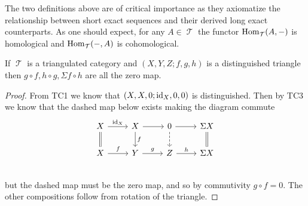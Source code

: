 \documentclass[11pt]{article}
\DeclareMathOperator{\TT}{\mathcal{T}}
\begin{document}
The two definitions above are of critical importance as they axiomatize the relationship between short exact sequences and their derived long exact counterparts. As one should expect, for any $A \in \TT$ the functor $\Hom_{\TT}(A,-)$ is homological and $\Hom_{\TT}(-,A)$ is cohomological.

\begin{lem}
If $\TT$ is a triangulated category and $(X,Y,Z; f,g,h)$ is a distinguished triangle then $g\circ f,h\circ g,\Sigma f\circ h$ are all the zero map.
\end{lem}
\begin{proof}
From TC1 we know that $(X,X,0; \operatorname{id}_X, 0,0)$ is distinguished. Then by TC3 we know that the dashed map below exists making the diagram commute
\[\begin{tikzcd}
X \ar[r,"\id_X"] \ar[d, equal] & X \ar[r] \ar[d,"f"] & 0 \ar[d,dashed] \ar[r] & \Sigma X \ar[d,equal]\\
X \ar[r,"f"] & Y \ar[r,"g"] & Z \ar[r,"h"] & \Sigma X\\
\end{tikzcd}\]
but the dashed map must be the zero map, and so by commutivity $g\circ f= 0 $. The other compositions follow from rotation of the triangle.
\end{proof}
\end{document}
